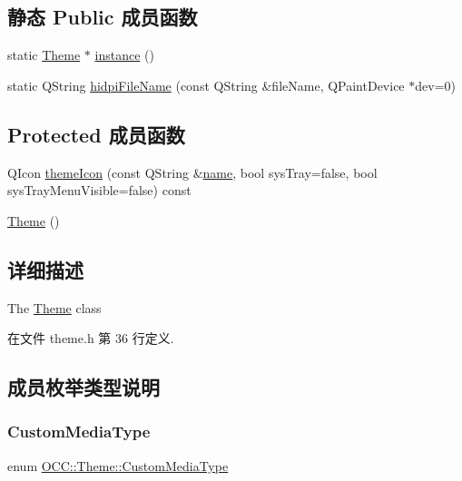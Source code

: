 \subsection*{静态 Public 成员函数}
\begin{DoxyCompactItemize}
\item 
static \hyperlink{class_o_c_c_1_1_theme}{Theme} $\ast$ \hyperlink{class_o_c_c_1_1_theme_acd2ed433148391dd4993d76cb281a596}{instance} ()
\item 
static Q\+String \hyperlink{class_o_c_c_1_1_theme_a654abbe3f9136fa84fa1e49fe73445fc}{hidpi\+File\+Name} (const Q\+String \&file\+Name, Q\+Paint\+Device $\ast$dev=0)
\end{DoxyCompactItemize}
\subsection*{Protected 成员函数}
\begin{DoxyCompactItemize}
\item 
Q\+Icon \hyperlink{class_o_c_c_1_1_theme_a5ccbdaad81bd46b9abb284a82832a93e}{theme\+Icon} (const Q\+String \&\hyperlink{utility_8cpp_a8f8f80d37794cde9472343e4487ba3eb}{name}, bool sys\+Tray=false, bool sys\+Tray\+Menu\+Visible=false) const
\item 
\hyperlink{class_o_c_c_1_1_theme_afc9a42df6c6378adeb9b9085c7194f19}{Theme} ()
\end{DoxyCompactItemize}


\subsection{详细描述}
The \hyperlink{class_o_c_c_1_1_theme}{Theme} class 

在文件 theme.\+h 第 36 行定义.



\subsection{成员枚举类型说明}
\mbox{\label{class_o_c_c_1_1_theme_a7d36668d1fd0d715e4e1d8f4590d2d5d}} 
\subsubsection{\texorpdfstring{Custom\+Media\+Type}{CustomMediaType}}
{\footnotesize\ttfamily enum \hyperlink{class_o_c_c_1_1_theme_a7d36668d1fd0d715e4e1d8f4590d2d5d}{O\+C\+C\+::\+Theme\+::\+Custom\+Media\+Type}}

